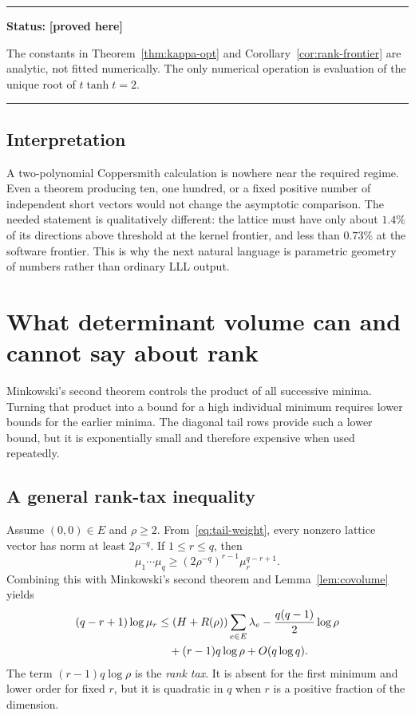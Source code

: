 \documentclass[11pt,oneside]{article}
\theoremstyle{definition}
\theoremstyle{remark}
\newcommand{\statusproved}{\textcolor{provedgreen}{\textbf{[proved here]}}}
\newenvironment{statusbox}[1]
{\begin{center}\begin{minipage}{0.94\textwidth}\raggedright\hrule\vspace{0.45em}\textbf{Status:} #1\par\vspace{0.35em}}
{\vspace{0.35em}\hrule\end{minipage}\end{center}}
\begin{document}
\begin{statusbox}{\statusproved}
The constants in Theorem~\ref{thm:kappa-opt} and Corollary~\ref{cor:rank-frontier} are analytic,
not fitted numerically.  The only numerical operation is evaluation of the unique root of
$t\tanh t=2$.
\end{statusbox}

\subsection{Interpretation}

A two-polynomial Coppersmith calculation is nowhere near the required regime.  Even a theorem
producing ten, one hundred, or a fixed positive number of independent short vectors would not
change the asymptotic comparison.  The needed statement is qualitatively different: the
lattice must have only about $1.4\%$ of its directions above threshold at the kernel frontier,
and less than $0.73\%$ at the software frontier.  This is why the next natural language is
parametric geometry of numbers rather than ordinary LLL output.

\section{What determinant volume can and cannot say about rank}
\label{sec:volume-rank}

Minkowski's second theorem controls the product of all successive minima.  Turning that product
into a bound for a high individual minimum requires lower bounds for the earlier minima.  The
diagonal tail rows provide such a lower bound, but it is exponentially small and therefore
expensive when used repeatedly.

\subsection{A general rank-tax inequality}

Assume $(0,0)\in E$ and $\rho\ge2$.  From~\eqref{eq:tail-weight}, every nonzero lattice vector
has norm at least $2\rho^{-q}$.  If $1\le r\le q$, then
\[
 \mu_1\cdots\mu_q
 \ge (2\rho^{-q})^{r-1}\mu_r^{q-r+1}.
\]
Combining this with Minkowski's second theorem and Lemma~\ref{lem:covolume} yields
\begin{align}
 (q-r+1)\log\mu_r
 &\le (H+R(\rho))\sum_{e\in E}\lambda_e
      -\frac{q(q-1)}2\log\rho\notag\\
 &\quad +(r-1)q\log\rho+O(q\log q).
 \label{eq:rank-tax}
\end{align}
The term $(r-1)q\log\rho$ is the \emph{rank tax}.  It is absent for the first minimum and
lower order for fixed $r$, but it is quadratic in $q$ when $r$ is a positive fraction of the
dimension.
\end{document}
